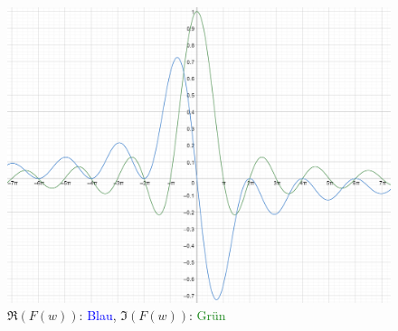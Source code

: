 \documentclass[12pt,a4paper]{article}
\newcommand{\blue}[1]{\textcolor{blue} {#1}}
\newcommand{\green}[1]{\textcolor{ForestGreen} {#1}}
\begin{document}
\begin{figure}[H]
\centering
\includegraphics[scale=0.2]{./resources/ft_res.png}
\caption{$\Re(F(w))$: \blue{Blau}, $\Im(F(w))$: \green{Grün}}
\end{figure}
\end{document}
